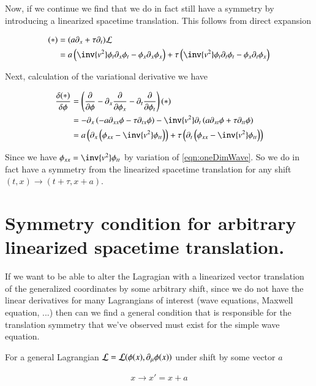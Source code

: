 \documentclass{article}
\begin{document}
Now, if we continue we find that we do in fact still have a symmetry by introducing a linearized spacetime translation.
This follows from direct expansion

\begin{align*}
(*) 
&= (a \partial_x + \tau \partial_t) \LL \\
&= 
a 
\left(
\inv{v^2} \phi_t \partial_x \phi_t
- \phi_x \partial_x \phi_x
\right)
+ \tau 
\left(
\inv{v^2} \phi_t \partial_t \phi_t
- \phi_x \partial_t \phi_x
\right) \\
\end{align*}

Next, calculation of the variational derivative we have

\begin{align*}
\frac{\delta(*)}{\delta \phi}
&=
\left( \PD{\phi}{} - \partial_x \PD{\phi_x}{} - \partial_t \PD{\phi_t}{} \right) (*) \\
&=
-\partial_x \left( -a \partial_{xx} \phi - \tau \partial_{tx}\phi \right) 
-\inv{v^2} \partial_t \left( a \partial_{xt} \phi + \tau \partial_{tt}\phi \right) \\
&=
a \left( 
\partial_x \left(
\phi_{xx} - \inv{v^2} \phi_{tt}
\right)
\right)
+ \tau \left( 
\partial_t \left(
\phi_{xx} - \inv{v^2} \phi_{tt}
\right)
\right) \\
\end{align*}

Since we have $\phi_{xx} = \inv{v^2} \phi_{tt}$ by variation of \ref{eqn:oneDimWave}.  So we do in fact have a symmetry from the 
linearized spacetime translation for any shift $(t,x) \rightarrow (t+\tau, x+a)$.

\section{ Symmetry condition for arbitrary linearized spacetime translation. }

If we want to be able to alter the Lagragian with a linearized vector translation of the generalized coordinates by some arbitrary 
shift, since we do not have the linear derivatives for many Lagrangians of interest (wave equations, Maxwell equation, ...)
then can we find a general condition that is responsible for the translation symmetry that we've observed must exist for
the simple wave equation.

For a general Lagrangian $\mathcal{L} = \mathcal{L}(\phi(x), \partial_\mu \phi(x))$ under shift by some vector $a$

\begin{align*}
x \rightarrow x' = x + a
\end{align*}
\end{document}

